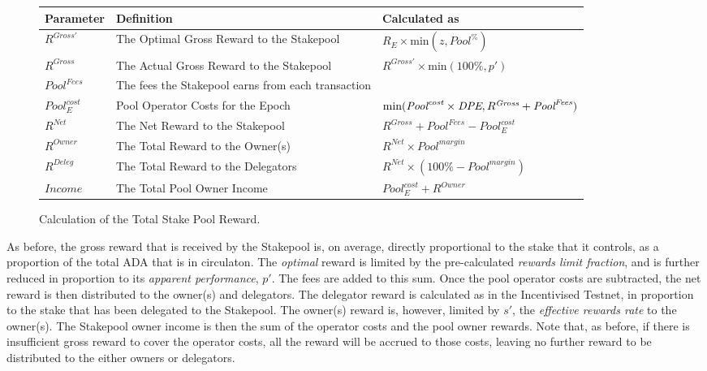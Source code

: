 \documentclass[11pt,a4paper,dvipsnames,twosided,final]{article}
\newcommand{\ada}{ADA{}}
\begin{document}
\begin{figure}[h!]
\begin{center}
\begin{tabular}{||l|p{6cm}|l||}
  \hline \hline
\textbf{Parameter}  & \textbf{Definition} & \textbf{Calculated as} \\\hline
$R^{Gross'}$ & The Optimal Gross Reward to the Stakepool & $R_E \times \textrm{min} (z,{\textit{Pool}}^\%)$ \\\hline
$R^{\textit{Gross}}$ & The Actual Gross Reward to the Stakepool & $R^{Gross'} \times \textrm{min} (100\%,p')$ \\\hline
${\textit{Pool}}^{\textit{Fees}}$ & The fees the Stakepool earns from each transaction & \\\hline
${\textit{Pool}}^{\textit{cost}}_E$ & Pool Operator Costs for the Epoch & $\textrm{min}(\textit{\textit{Pool}}^{\textit{cost}} \times \textit{DPE},R^{\textit{Gross}}+{\textit{Pool}}^{\textit{Fees}})$ \\\hline
$R^{\textit{Net}}$  & The Net Reward to the Stakepool & $R^{\textit{Gross}}+{\textit{Pool}}^{\textit{Fees}} - {\textit{Pool}}^{\textit{cost}}_E$ \\\hline
$R^{\textit{Owner}}$ & The Total Reward to the Owner(s) & $R^{\textit{Net}} \times {\textit{Pool}}^{\textit{margin}} $ \\\hline
$R^{\textit{Deleg}}$ & The Total Reward to the Delegators & $R^{\textit{Net}} \times (100\% - {\textit{Pool}}^{\textit{margin}})$ \\\hline
$\textit{Income}$ & The Total Pool Owner Income & ${\textit{Pool}}^{\textit{cost}}_E + R^{Owner}$ \\\hline
\hline
\end{tabular}
\end{center}
\caption{Calculation of the Total Stake Pool Reward.}
\end{figure}

\noindent
As before, the gross reward that is received by the Stakepool is, on average, directly proportional to the
stake that it controls, as a proportion of the total \ada{} that is in circulaton.
The \emph{optimal} reward is limited by the pre-calculated \emph{rewards limit fraction}, and is further reduced in
proportion to its \emph{apparent performance}, $p'$.
The fees are added to this sum.
Once the pool operator costs are subtracted,
the net reward is then distributed to the owner(s) and delegators.
The delegator reward is calculated as in the Incentivised Testnet, in proportion to the stake that has
been delegated to the Stakepool.
The owner(s) reward is, however, limited by $s'$, the \emph{effective rewards rate} to the owner(s).
%
The Stakepool owner income is then the sum of the operator costs and the pool owner rewards.
Note that, as before, if there is insufficient gross reward to cover the operator costs, all the reward will be accrued to those
costs, leaving no further reward to be distributed to the either owners or delegators.
\end{document}
